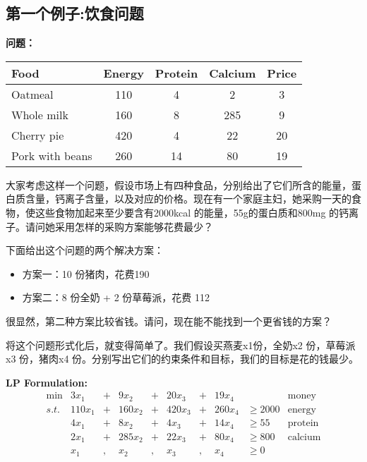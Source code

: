 \subsection{第一个例子:饮食问题}
\textbf{问题：}
\newpage
\begin{table}
\begin{center}
  { \begin{tabular}{l|ccc|c}\hline
       Food & Energy & Protein & Calcium  & Price \\
 \hline
 Oatmeal & 110 & 4 & 2 & 3 \\
 Whole milk & 160 & 8 & 285 & 9 \\
 Cherry pie & 420 & 4 & 22 & 20 \\
 Pork with beans & 260 & 14 & 80 & 19 \\
\hline
\end{tabular}} {}%
\end{center}

\end{table}


大家考虑这样一个问题，假设市场上有四种食品，分别给出了它们所含的能量，蛋白质含量，钙离子含量，以及对应的价格。现在有一个家庭主妇，她采购一天的食物，使这些食物加起来至少要含有2000kcal 的能量，55g的蛋白质和800mg 的钙离子。请问她采用怎样的采购方案能够花费最少？


下面给出这个问题的两个解决方案：
\begin{itemize}
  \item 方案一：10 份猪肉，花费190
  \item 方案二：8 份全奶 + 2 份草莓派，花费 112
\end{itemize}

很显然，第二种方案比较省钱。请问，现在能不能找到一个更省钱的方案？

将这个问题形式化后，就变得简单了。我们假设买燕麦x1份，全奶x2 份，草莓派x3 份，猪肉x4 份。分别写出它们的约束条件和目标，我们的目标是花的钱最少。

\textbf{LP Formulation:}
\[
\begin{array}{rrrrrrrrlr}
 \min & 3x_1   &+& 9 x_2   &+& 20x_3   &+& 19x_4   & & \text{money}\\
 s.t. & 110x_1 &+& 160 x_2 &+& 420 x_3 &+& 260 x_4 & \geq 2000 & \text{energy} \\
      & 4 x_1  &+& 8 x_2   &+& 4 x_3   &+& 14 x_4  & \geq 55 & \text{protein}\\
      &  2 x_1 &+& 285 x_2 &+& 22 x_3  &+& 80 x_4  & \geq 800 & \text{calcium}\\
      & x_1    &,& x_2     &,& x_3     &,&    x_4  & \geq 0 \\
\end{array} \nonumber
\]

